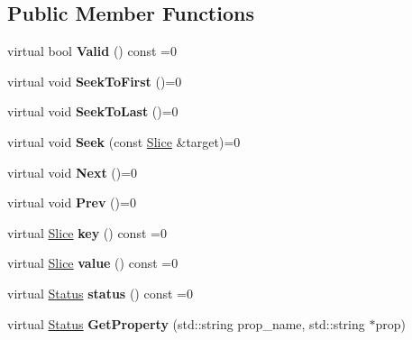 \subsection*{Public Member Functions}
\begin{DoxyCompactItemize}
\item 
virtual bool {\bfseries Valid} () const =0\hypertarget{classrocksdb_1_1Iterator_a866c8627787b3a768273ae4893f27f8f}{}\label{classrocksdb_1_1Iterator_a866c8627787b3a768273ae4893f27f8f}

\item 
virtual void {\bfseries Seek\+To\+First} ()=0\hypertarget{classrocksdb_1_1Iterator_a99d2e05c952cecb0f4a0fa60412bafc2}{}\label{classrocksdb_1_1Iterator_a99d2e05c952cecb0f4a0fa60412bafc2}

\item 
virtual void {\bfseries Seek\+To\+Last} ()=0\hypertarget{classrocksdb_1_1Iterator_a72603897beae5180e1785ee095ca43f4}{}\label{classrocksdb_1_1Iterator_a72603897beae5180e1785ee095ca43f4}

\item 
virtual void {\bfseries Seek} (const \hyperlink{classrocksdb_1_1Slice}{Slice} \&target)=0\hypertarget{classrocksdb_1_1Iterator_aeed06527f83bf2863595fc9514511d7d}{}\label{classrocksdb_1_1Iterator_aeed06527f83bf2863595fc9514511d7d}

\item 
virtual void {\bfseries Next} ()=0\hypertarget{classrocksdb_1_1Iterator_a06da095e0c88cc65ac23e4ec88d0a390}{}\label{classrocksdb_1_1Iterator_a06da095e0c88cc65ac23e4ec88d0a390}

\item 
virtual void {\bfseries Prev} ()=0\hypertarget{classrocksdb_1_1Iterator_acc6625d2209a48343c1ebce4c2528e23}{}\label{classrocksdb_1_1Iterator_acc6625d2209a48343c1ebce4c2528e23}

\item 
virtual \hyperlink{classrocksdb_1_1Slice}{Slice} {\bfseries key} () const =0\hypertarget{classrocksdb_1_1Iterator_a34cfd17f7b64652774de76cbc0e5b202}{}\label{classrocksdb_1_1Iterator_a34cfd17f7b64652774de76cbc0e5b202}

\item 
virtual \hyperlink{classrocksdb_1_1Slice}{Slice} {\bfseries value} () const =0\hypertarget{classrocksdb_1_1Iterator_a1a503134af26025486d5c640e49cdf54}{}\label{classrocksdb_1_1Iterator_a1a503134af26025486d5c640e49cdf54}

\item 
virtual \hyperlink{classrocksdb_1_1Status}{Status} {\bfseries status} () const =0\hypertarget{classrocksdb_1_1Iterator_a5435c832490b19d4c3aebf7c4877098d}{}\label{classrocksdb_1_1Iterator_a5435c832490b19d4c3aebf7c4877098d}

\item 
virtual \hyperlink{classrocksdb_1_1Status}{Status} {\bfseries Get\+Property} (std\+::string prop\+\_\+name, std\+::string $\ast$prop)\hypertarget{classrocksdb_1_1Iterator_a262a0e911087b145e95ac2a4603289f7}{}\label{classrocksdb_1_1Iterator_a262a0e911087b145e95ac2a4603289f7}

\end{DoxyCompactItemize}
